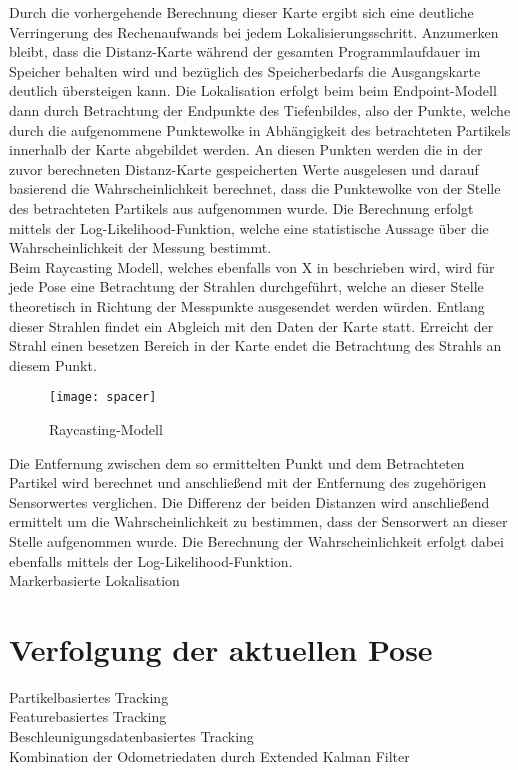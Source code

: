 Durch die vorhergehende Berechnung dieser Karte ergibt sich eine deutliche Verringerung des Rechenaufwands bei jedem Lokalisierungsschritt. Anzumerken bleibt, dass die Distanz-Karte während der gesamten Programmlaufdauer im Speicher behalten wird und bezüglich des Speicherbedarfs die Ausgangskarte deutlich übersteigen kann. Die Lokalisation erfolgt beim beim Endpoint-Modell dann durch Betrachtung der Endpunkte des Tiefenbildes, also der Punkte, welche durch die aufgenommene Punktewolke in Abhängigkeit des betrachteten Partikels innerhalb der Karte abgebildet werden. An diesen Punkten werden die in der zuvor berechneten Distanz-Karte gespeicherten Werte ausgelesen und darauf basierend die Wahrscheinlichkeit berechnet, dass die Punktewolke von der Stelle des betrachteten Partikels aus aufgenommen wurde. Die Berechnung erfolgt mittels der Log-Likelihood-Funktion, welche eine statistische Aussage über die Wahrscheinlichkeit der Messung bestimmt.\\
Beim Raycasting Modell, welches ebenfalls von X in \cite{Raycasting} beschrieben wird, wird für jede Pose eine Betrachtung der Strahlen durchgeführt, welche an dieser Stelle theoretisch in Richtung der Messpunkte ausgesendet werden würden. Entlang dieser Strahlen findet ein Abgleich mit den Daten der Karte statt. Erreicht der Strahl einen besetzen Bereich in der Karte endet die Betrachtung des Strahls an diesem Punkt.\\

\begin{figure}[!ht]
	\begin{center}
		\texttt{[image: spacer]}
		\caption{Raycasting-Modell}
		\label{fig.raycast}
	\end{center}
\end{figure}

Die Entfernung zwischen dem so ermittelten Punkt und dem Betrachteten Partikel wird berechnet und anschließend mit der Entfernung des zugehörigen Sensorwertes verglichen. Die Differenz der beiden Distanzen wird anschließend ermittelt um die Wahrscheinlichkeit zu bestimmen, dass der Sensorwert an dieser Stelle aufgenommen wurde. Die Berechnung der Wahrscheinlichkeit erfolgt dabei ebenfalls mittels der Log-Likelihood-Funktion.\\
Markerbasierte Lokalisation\\

\section{Verfolgung der aktuellen Pose}
Partikelbasiertes Tracking\\
Featurebasiertes Tracking\\
Beschleunigungsdatenbasiertes Tracking\\
Kombination der Odometriedaten durch Extended Kalman Filter\\